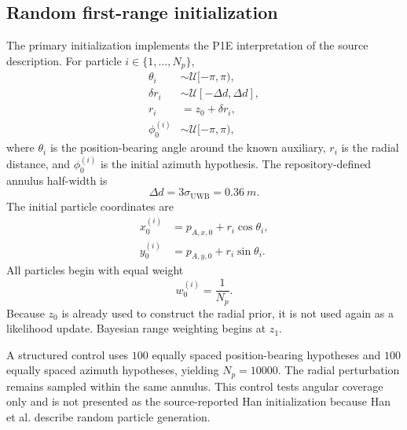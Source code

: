 \subsection{Random first-range initialization}
The primary initialization implements the P1E interpretation of the source description. For particle $i\in\{1,\ldots,N_p\}$,
\begin{align}
    \theta_i &\sim\mathcal U[-\pi,\pi),\\
    \delta r_i &\sim\mathcal U[-\Delta d,\Delta d],\\
    r_i &= z_0+\delta r_i,\\
    \phi_0^{(i)} &\sim\mathcal U[-\pi,\pi),
\end{align}
where $\theta_i$ is the position-bearing angle around the known auxiliary, $r_i$ is the radial distance, and $\phi_0^{(i)}$ is the initial azimuth hypothesis. The repository-defined annulus half-width is
\begin{equation}
    \Delta d=3\sigma_{\mathrm{UWB}}=\SI{0.36}{m}.
\end{equation}
The initial particle coordinates are
\begin{align}
    x_0^{(i)} &= p_{A,x,0}+r_i\cos\theta_i,\\
    y_0^{(i)} &= p_{A,y,0}+r_i\sin\theta_i.
\end{align}
All particles begin with equal weight
\begin{equation}
    w_0^{(i)}=\frac{1}{N_p}.
\end{equation}
Because $z_0$ is already used to construct the radial prior, it is not used again as a likelihood update. Bayesian range weighting begins at $z_1$.

A structured control uses $100$ equally spaced position-bearing hypotheses and $100$ equally spaced azimuth hypotheses, yielding $N_p=10000$. The radial perturbation remains sampled within the same annulus. This control tests angular coverage only and is not presented as the source-reported Han initialization because Han et al. describe random particle generation.

